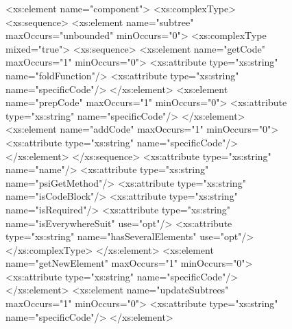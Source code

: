\documentclass{matmex-diploma}
\begin{document}
\begin{figure}[H]
    \begin{pyglist}[language=xml]
  <xs:element name="component">
    <xs:complexType>
      <xs:sequence>
        <xs:element name="subtree" maxOccurs="unbounded" minOccurs="0">
          <xs:complexType mixed="true">
            <xs:sequence>
              <xs:element name="getCode" maxOccurs="1" minOccurs="0">
                <xs:attribute type="xs:string" name="foldFunction"/>
                <xs:attribute type="xs:string" name="specificCode"/>
              </xs:element>
              <xs:element name="prepCode" maxOccurs="1" minOccurs="0">
                <xs:attribute type="xs:string" name="specificCode"/>
              </xs:element>
              <xs:element name="addCode" maxOccurs="1" minOccurs="0">
                <xs:attribute type="xs:string" name="specificCode"/>
              </xs:element>
            </xs:sequence>
            <xs:attribute type="xs:string" name="name"/>
            <xs:attribute type="xs:string" name="psiGetMethod"/>
            <xs:attribute type="xs:string" name="isCodeBlock"/>
            <xs:attribute type="xs:string" name="isRequired"/>
            <xs:attribute type="xs:string" name="isEverywhereSuit" use="opt"/>
            <xs:attribute type="xs:string" name="hasSeveralElements" use="opt"/>
          </xs:complexType>
        </xs:element>    
        <xs:element name="getNewElement" maxOccurs="1" minOccurs="0">
          <xs:attribute type="xs:string" name="specificCode"/>
        </xs:element>
        <xs:element name="updateSubtrees" maxOccurs="1" minOccurs="0">
          <xs:attribute type="xs:string" name="specificCode"/>
        </xs:element>
    \end{pyglist}
\end{figure}
\end{document}
